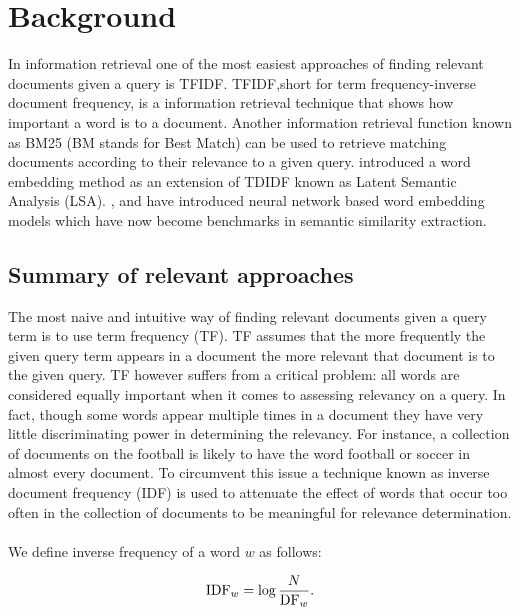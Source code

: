 \chapter{Background} 
\label{chapter:background}


In information retrieval one of the most easiest approaches of finding relevant documents given a query is TFIDF.
TFIDF,short for term frequency-inverse document frequency, is a information retrieval technique that shows how important a word is to a document. Another information retrieval function known as BM25 (BM stands for Best Match) \cite{robertson2009probabilistic} can be used to retrieve matching documents according to their relevance to a given query. \cite{dumais2004latent} introduced a word embedding method as an extension of TDIDF known as Latent Semantic Analysis (LSA). \cite{mikolov2013efficient}, \cite{pennington2014glove} and \cite{shazeer2016swivel} have introduced neural network based word embedding models which have now become benchmarks in semantic similarity extraction.


\section{Summary of relevant approaches}
The most naive and intuitive way of finding relevant documents given a query term is to use term frequency (TF). TF assumes that the more frequently the given query term appears in a document the more relevant that document is to the given query. TF however suffers from a critical problem: all words are considered equally important when it comes to assessing relevancy on a query. In fact, though some words appear multiple times in a document they have very little discriminating power  in determining the relevancy. For instance, a collection of documents on the football is likely to have the word football or soccer in almost every document. To circumvent this issue a technique known as inverse document frequency (IDF) is used to  attenuate the effect of words that occur too often in the collection of documents to be meaningful for relevance determination.
\\
\\
We define inverse frequency of a word $w$ as follows:

\begin{displaymath}
\mbox{IDF}_w = \log {N\over \mbox{DF}_w}.
\end{displaymath}


